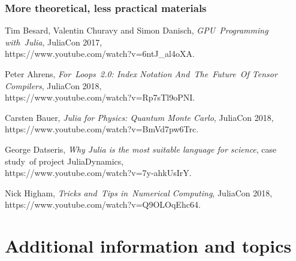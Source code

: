 \documentclass[10pt,t]{beamer}
\begin{document}
\begin{frame}
  \frametitle{More theoretical, less practical materials}


  Tim Besard, Valentin Churavy and Simon Danisch,
  \textit{GPU~Programming with~Julia}, JuliaCon 2017, \\
  {https://www.youtube.com/watch?v=6ntJ\_al4oXA}.

  \vspace{0.3em}



  Peter Ahrens, \emph{For~Loops~2.0: Index Notation
    And~The~Future~Of Tensor Compilers}, JuliaCon 2018, \\
  {https://www.youtube.com/watch?v=Rp7sTl9oPNI}.

  \vspace{0.3em}



  Carsten Bauer, \emph{Julia for Physics: Quantum Monte Carlo},
  JuliaCon 2018,
  {https://www.youtube.com/watch?v=BmVd7pw6Trc}.

  \vspace{0.3em}



  George Datseris, \emph{Why Julia is the most suitable
    language for science}, case study~of project JuliaDynamics, \\
  {https://www.youtube.com/watch?v=7y-ahkUsIrY}.

  \vspace{0.3em}



  Nick Higham, \emph{Tricks and~Tips in~Numerical Computing}, JuliaCon
  2018, 
  {https://www.youtube.com/watch?v=Q9OLOqEhc64}.

\end{frame}










\section{Additional information and topics}
\end{document}
